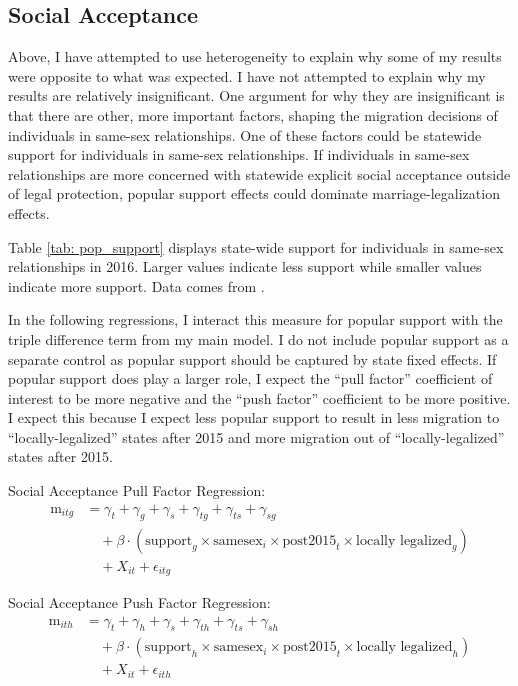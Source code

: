 \documentclass[12pt,letterpaper]{article}
\begin{document}
\clearpage
\subsection{Social Acceptance}

Above, I have attempted to use heterogeneity to explain why some of my results were opposite to what was expected. I have not attempted to explain why my results are relatively insignificant. One argument for why they are insignificant is that there are other, more important factors, shaping the migration decisions of individuals in same-sex relationships. One of these factors could be statewide support for individuals in same-sex relationships. If individuals in same-sex relationships are more concerned with statewide explicit social acceptance outside of legal protection, popular support effects could dominate marriage-legalization effects.

Table \ref{tab: pop_support} displays state-wide support for individuals in same-sex relationships in 2016. Larger values indicate less support while smaller values indicate more support. Data comes from \citet{29}.



In the following regressions, I interact this measure for popular support with the triple difference term from my main model. I do not include popular support as a separate control as popular support should be captured by state fixed effects. If popular support does play a larger role, I expect the “pull factor” coefficient of interest to be more negative and the “push factor” coefficient to be more positive. I expect this because I expect less popular support to result in less migration to “locally-legalized” states after 2015 and more migration out of “locally-legalized” states after 2015. 

\hfill
\break
Social Acceptance Pull Factor Regression:
\begin{equation}
\begin{aligned}
\text{m}_{itg} &= \gamma_t + \gamma_g + \gamma_s + \gamma_{tg} + \gamma_{ts} + \gamma_{sg} \\
&\quad + \beta \cdot (\text{support}_g \times \text{samesex}_i \times \text{post2015}_t \times \text{locally legalized}_g) \\
&\quad + X_{it} + \epsilon_{itg}
\end{aligned}
\end{equation}

\hfill
\break
Social Acceptance Push Factor Regression:
\begin{equation}
\begin{aligned}
\text{m}_{ith} &= \gamma_t + \gamma_h + \gamma_s + \gamma_{th} + \gamma_{ts} + \gamma_{sh} \\
&\quad + \beta \cdot (\text{support}_h \times \text{samesex}_i \times \text{post2015}_t \times \text{locally legalized}_h) \\
&\quad + X_{it} + \epsilon_{ith}
\end{aligned}
\end{equation}
\end{document}
